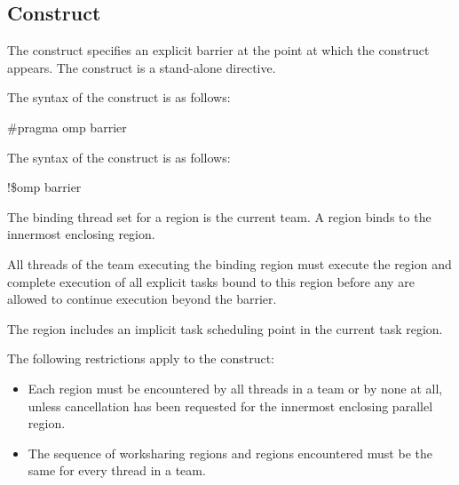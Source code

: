 {{{{\subsection{ Construct}
\label{subsec:barrier Construct}
\summary
The  construct specifies an explicit barrier at the point at which the construct 
appears. The  construct is a stand-alone directive.

\syntax
\ccppspecificstart
The syntax of the  construct is as follows:

\begin{boxedcode}
\#pragma omp barrier 
\end{boxedcode}
\ccppspecificend

\fortranspecificstart
The syntax of the  construct is as follows:

\begin{boxedcode}
!\$omp barrier
\end{boxedcode}
\fortranspecificend

\binding
The binding thread set for a  region is the current team. A  region 
binds to the innermost enclosing  region. 

\descr
All threads of the team executing the binding  region must execute the 
 region and complete execution of all explicit tasks bound to this  
region before any are allowed to continue execution beyond the barrier.

The  region includes an implicit task scheduling point in the current task 
region.

\restrictions
The following restrictions apply to the  construct:

\begin{itemize}
\item Each  region must be encountered by all threads in a team or by none at all, 
unless cancellation has been requested for the innermost enclosing parallel region.

\item The sequence of worksharing regions and  regions encountered must be the 
same for every thread in a team.
\end{itemize}









}}}}
